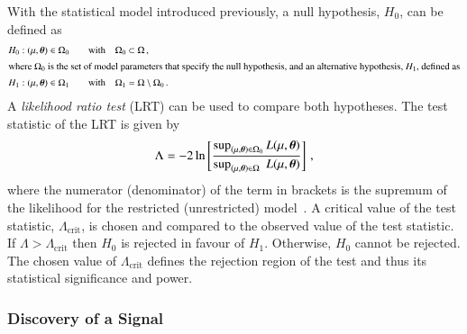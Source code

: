 With the statistical model introduced previously, a null hypothesis, $H_0$, can be defined as
\begin{alignat*}{3}
  &H_0: (\mu, \myvec{\theta}) \in \Omega_0
    \quad &\text{with} \quad &\Omega_0 \subset \Omega \,\text{,} \\
  \intertext{where $\Omega_0$ is the set of model parameters that specify the
  null hypothesis, and an alternative hypothesis, $H_1$, defined as}
  &H_1: (\mu, \myvec{\theta}) \in \Omega_1
    \quad &\text{with} \quad &\Omega_1 = \Omega \setminus \Omega_0 \,\text{.}
\end{alignat*}
%
%
A \emph{likelihood ratio test} (LRT) can be used to compare both hypotheses. The
test statistic of the LRT is given by
\begin{align*}
  \Lambda = -2 \ln \left[
  \frac{\sup_{(\mu, \myvec{\theta}) \in \Omega_0} L(\mu, \myvec{\theta})}
  {\sup_{(\mu, \myvec{\theta}) \in \Omega\phantom{_0}} L(\mu, \myvec{\theta})}
  \right] \,\text{,}
\end{align*}
where the numerator (denominator) of the term in brackets is the supremum of the
likelihood for the restricted (unrestricted) model~\cite{casella2001}. A
critical value of the test statistic, $\Lambda_{\text{crit}}$, is chosen and
compared to the observed value of the test statistic. If
$\Lambda > \Lambda_{\text{crit}}$ then $H_0$ is rejected in favour of
$H_1$. Otherwise, $H_0$ cannot be rejected. The chosen value of
$\Lambda_{\text{crit}}$ defines the rejection region of the test and thus its
statistical significance and power.


\subsubsection{Discovery of a Signal}

